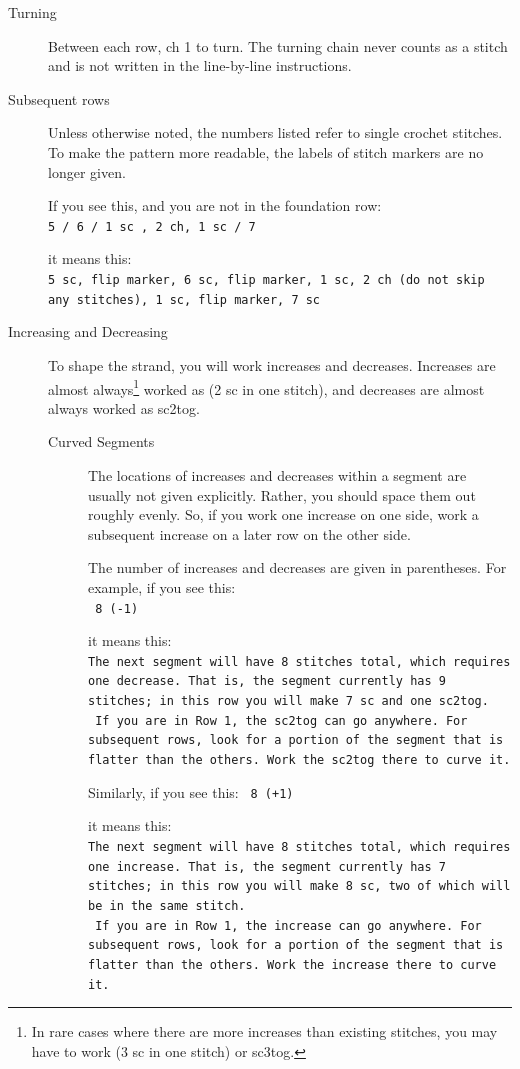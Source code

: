 \documentclass[openany]{book}
\begin{document}
\begin{description}
 \item[Turning] Between each row, ch 1 to turn. The turning chain never counts as a stitch and is not written in the line-by-line instructions.
 \item[Subsequent rows] Unless otherwise noted, the numbers listed refer to single crochet stitches. To make the pattern more readable, the labels of stitch markers are no longer given. 
 
 If you see this, and you are not in the foundation row:\\
 \texttt{5 / 6 / 1 sc , 2 ch, 1 sc / 7}
 
 it means this:\\
 \texttt{5 sc, flip marker, 6 sc, flip marker, 1 sc, 2 ch (do not skip any stitches), 1 sc, flip marker, 7 sc}
 \item[Increasing and Decreasing] To shape the strand, you will work increases and decreases. Increases are almost always\footnote{In rare cases where there are more increases than existing stitches, you may have to work (3 sc in one stitch) or sc3tog.} worked as (2 sc in one stitch), and decreases are almost always worked as sc2tog. 
 \begin{description}
 \item[Curved Segments]
 The locations of increases and decreases within a segment are usually not given explicitly. Rather, you should space them out roughly evenly. 
 So, if you work one increase on one side, work a subsequent increase on a later row on the other side. 

 
 The number of increases and decreases are given in parentheses. For example, if you see this:\\
 \texttt{ 8 (-1) }
 
 
it means this:\\
 \texttt{The next segment will have 8 stitches total, which requires one decrease. That is, the segment currently has 9 stitches; in this row you will make 7 sc and one sc2tog. }
 \\
\texttt{ If you are in Row 1, the sc2tog can go anywhere. For subsequent rows, look for a portion of the segment that is flatter than the others. Work the sc2tog there to curve it.}\medskip
 
 Similarly, if you see this:
 \texttt{ 8 (+1) }
 
 
it means this:\\
 \texttt{The next segment will have 8 stitches total, which requires one increase. That is, the segment currently has 7 stitches; in this row you will make 8 sc, two of which will be in the same stitch. }
 \\
\texttt{ If you are in Row 1, the increase can go anywhere. For subsequent rows, look for a portion of the segment that is flatter than the others. Work the increase there to curve it.}\medskip



\end{description}
\end{description}
\end{document}
